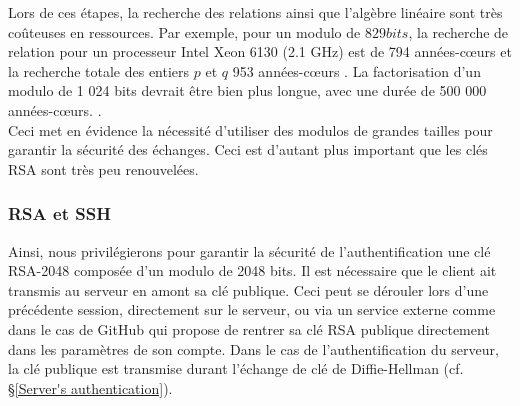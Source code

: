 Lors de ces étapes, la recherche des relations ainsi que l'algèbre linéaire sont très coûteuses en ressources. Par exemple, pour un modulo de $829 bits$, la recherche de relation pour un processeur Intel Xeon 6130 (2.1 GHz) est de 794 années-cœurs \cite{hostalot_attaque_nodate} et la recherche totale des entiers $p$ et $q$ 953 années-cœurs \cite{hostalot_attaque_nodate}. La factorisation d'un modulo de 1 024 bits devrait être bien plus longue, avec une durée de 500 000 années-cœurs. \cite{hostalot_attaque_nodate}.\\

Ceci met en évidence la nécessité d'utiliser des modulos de grandes tailles pour garantir la sécurité des échanges. Ceci est d'autant plus important que les clés RSA sont très peu renouvelées.

\subsubsection{RSA et SSH}
Ainsi, nous privilégierons pour garantir la sécurité de l'authentification une clé RSA-2048 composée d'un modulo de 2048 bits. Il est nécessaire que le client ait transmis au serveur en amont sa clé publique. Ceci peut se dérouler lors d'une précédente session, directement sur le serveur, ou via un service externe comme dans le cas de GitHub qui propose de rentrer sa clé RSA publique directement dans les paramètres de son compte. Dans le cas de l'authentification du serveur, la clé publique est transmise durant l'échange de clé de Diffie-Hellman (cf. §\ref{Server's authentication}).